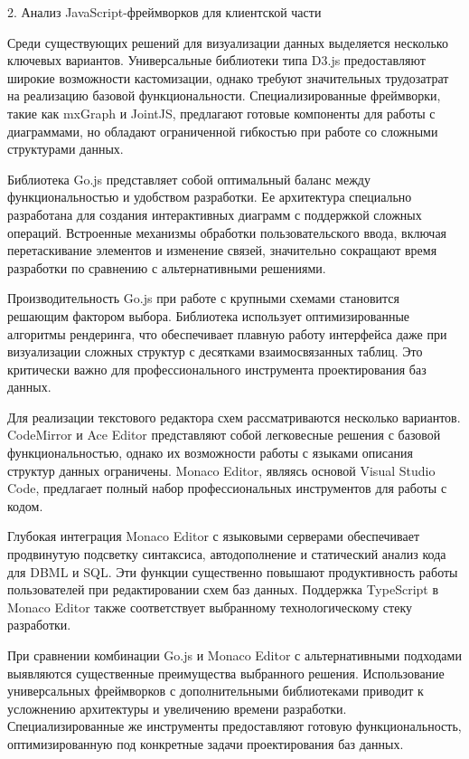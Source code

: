2. Анализ JavaScript-фреймворков для клиентской части

Среди существующих решений для визуализации данных выделяется несколько ключевых вариантов. Универсальные библиотеки типа D3.js предоставляют широкие возможности кастомизации, однако требуют значительных трудозатрат на реализацию базовой функциональности. Специализированные фреймворки, такие как mxGraph и JointJS, предлагают готовые компоненты для работы с диаграммами, но обладают ограниченной гибкостью при работе со сложными структурами данных.

Библиотека Go.js представляет собой оптимальный баланс между функциональностью и удобством разработки. Ее архитектура специально разработана для создания интерактивных диаграмм с поддержкой сложных операций. Встроенные механизмы обработки пользовательского ввода, включая перетаскивание элементов и изменение связей, значительно сокращают время разработки по сравнению с альтернативными решениями.

Производительность Go.js при работе с крупными схемами становится решающим фактором выбора. Библиотека использует оптимизированные алгоритмы рендеринга, что обеспечивает плавную работу интерфейса даже при визуализации сложных структур с десятками взаимосвязанных таблиц. Это критически важно для профессионального инструмента проектирования баз данных.

Для реализации текстового редактора схем рассматриваются несколько вариантов. CodeMirror и Ace Editor представляют собой легковесные решения с базовой функциональностью, однако их возможности работы с языками описания структур данных ограничены. Monaco Editor, являясь основой Visual Studio Code, предлагает полный набор профессиональных инструментов для работы с кодом.

Глубокая интеграция Monaco Editor с языковыми серверами обеспечивает продвинутую подсветку синтаксиса, автодополнение и статический анализ кода для DBML и SQL. Эти функции существенно повышают продуктивность работы пользователей при редактировании схем баз данных. Поддержка TypeScript в Monaco Editor также соответствует выбранному технологическому стеку разработки.

При сравнении комбинации Go.js и Monaco Editor с альтернативными подходами выявляются существенные преимущества выбранного решения. Использование универсальных фреймворков с дополнительными библиотеками приводит к усложнению архитектуры и увеличению времени разработки. Специализированные же инструменты предоставляют готовую функциональность, оптимизированную под конкретные задачи проектирования баз данных.

